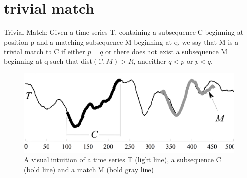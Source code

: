 \documentclass[12pt,a4paper]{article}
\begin{document}
	\section*{trivial match}
	Trivial Match: Given a time series T, containing a subsequence C beginning at position p and a matching subsequence M beginning at q, we say that M is a trivial match to C if either $p = q$ or there does not exist a subsequence M beginning at q such that dist$(C, M ) > R$, andeither $q < p$ or $p < q$.
	\begin{figure}[h]
		\includegraphics[width=\textwidth]{pic1.png}
		\caption{A visual intuition of a time series T (light line), a subsequence C
(bold line) and a match M (bold gray line)}
	\end{figure}
\end{document}
